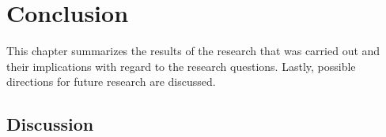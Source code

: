 \chapter{Conclusion}

This chapter summarizes the results of the research that was carried out and their implications with regard to the research questions. Lastly, possible directions for future research are discussed.

\section{Discussion}








